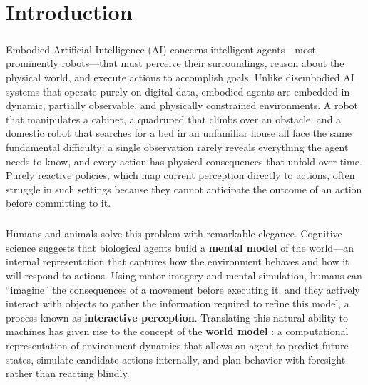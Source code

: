 \documentclass[12pt,a4paper,final]{extreport}
\begin{document}
\setcounter{page}{1}

\chapter{Introduction}

\paragraph{} Embodied Artificial Intelligence (AI) concerns intelligent agents---most prominently robots---that must perceive their surroundings, reason about the physical world, and execute actions to accomplish goals. Unlike disembodied AI systems that operate purely on digital data, embodied agents are embedded in dynamic, partially observable, and physically constrained environments. A robot that manipulates a cabinet, a quadruped that climbs over an obstacle, and a domestic robot that searches for a bed in an unfamiliar house all face the same fundamental difficulty: a single observation rarely reveals everything the agent needs to know, and every action has physical consequences that unfold over time. Purely reactive policies, which map current perception directly to actions, often struggle in such settings because they cannot anticipate the outcome of an action before committing to it.

\paragraph{} Humans and animals solve this problem with remarkable elegance. Cognitive science suggests that biological agents build a \textbf{mental model} of the world---an internal representation that captures how the environment behaves and how it will respond to actions. Using motor imagery and mental simulation, humans can ``imagine'' the consequences of a movement before executing it, and they actively interact with objects to gather the information required to refine this model, a process known as \textbf{interactive perception}. Translating this natural ability to machines has given rise to the concept of the \textbf{world model} \cite{ha2018}: a computational representation of environment dynamics that allows an agent to predict future states, simulate candidate actions internally, and plan behavior with foresight rather than reacting blindly.
\end{document}
